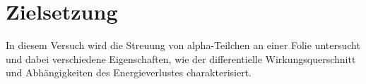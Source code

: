 \section{Zielsetzung}

\label{sec:Zielsetzung}
In diesem Versuch wird die Streuung von alpha-Teilchen an einer Folie untersucht und dabei verschiedene Eigenschaften, wie
der differentielle Wirkungsquerschnitt und Abhängigkeiten des Energieverlustes charakterisiert.
